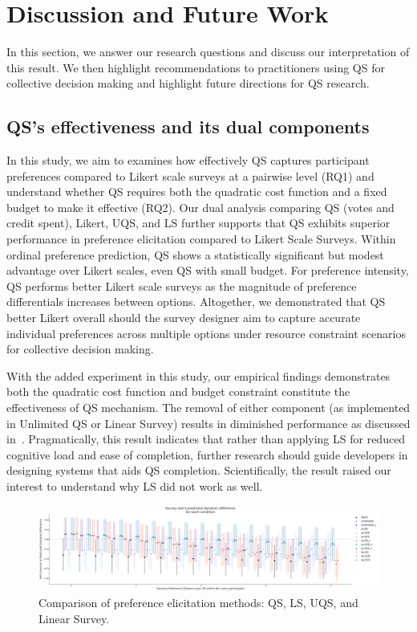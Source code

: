 \section{Discussion and Future Work}
\label{sec:discussion}
In this section, we answer our research questions and discuss our interpretation of this result. We then highlight recommendations to practitioners using QS for collective decision making and highlight future directions for QS research.

\subsection{QS's effectiveness and its dual components}
In this study, we aim to examines how effectively QS captures participant preferences compared to Likert scale surveys at a pairwise level (RQ1) and understand whether QS requires both the quadratic cost function and a fixed budget to make it effective (RQ2). Our dual analysis comparing QS (votes and credit spent), Likert, UQS, and LS further supports that QS exhibits superior performance in preference elicitation compared to Likert Scale Surveys. Within ordinal preference prediction, QS shows a statistically significant but modest advantage over Likert scales, even QS with small budget. For preference intensity, QS performs better Likert scale surveys as the magnitude of preference differentials increases between options. Altogether, we demonstrated that QS better Likert overall should the survey designer aim to capture accurate individual preferences across multiple options under resource constraint scenarios for collective decision making.

With the added experiment in this study, our empirical findings demonstrates both the quadratic cost function and budget constraint constitute the effectiveness of QS mechanism. The removal of either component (as implemented in Unlimited QS or Linear Survey) results in diminished performance as discussed in~. Pragmatically, this result indicates that rather than applying LS for reduced cognitive load and ease of completion, further research should guide developers in designing systems that aids QS completion. Scientifically, the result raised our interest to understand why LS did not work as well.

\begin{figure}[h]
    \centering
    \includegraphics[width=\textwidth]{content/image/Predicted_Donation_Diff_Interval.pdf}
    \caption{Comparison of preference elicitation methods: QS, LS, UQS, and Linear Survey.}
    \label{fig:comparison}
\end{figure}


